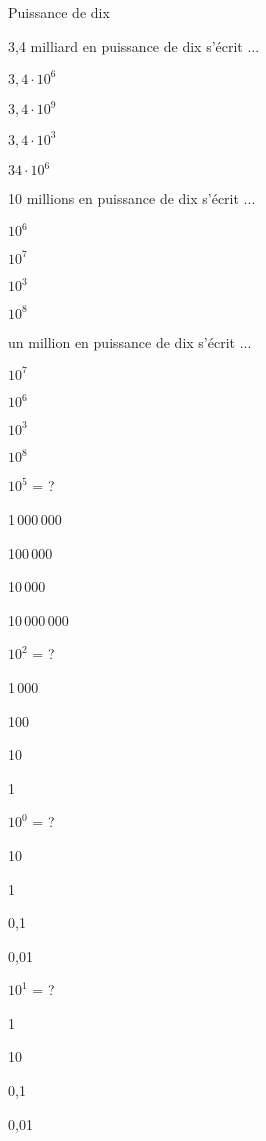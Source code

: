 \documentclass[12pt]{article}
\begin{document}
\begin{quiz}{Puissance de dix}

\begin{multi}[points=1]{}
3,4 milliard en puissance de dix s'écrit ...
\item $3,4\cdot 10^{6}$ 
\item   * $3,4\cdot 10^{9}$ 
\item $3,4\cdot 10^{3}$ 
\item  $34\cdot 10^{6}$ 
\end{multi}

\begin{multi}[points=1]{}
10 millions en puissance de dix s'écrit ...
\item $10^{6}$ 
\item   * $10^{7}$ 
\item $10^{3}$ 
\item  $10^{8}$ 
\end{multi}

\begin{multi}[points=1]{}
un million en puissance de dix s'écrit ...
\item $10^{7}$ 
\item   * $10^{6}$ 
\item $10^{3}$ 
\item  $10^{8}$ 
\end{multi}

\begin{multi}[points=1]{}
$10^5$ = ?
\item 1\,000\,000 
\item   * 100\,000
\item  10\,000
\item  10\,000\,000
\end{multi}

\begin{multi}[points=1]{}
$10^2$ = ?
\item 1\,000
\item   * 100
\item  10
\item  1
\end{multi}

\begin{multi}[points=1]{}
$10^0$ = ?
\item 10
\item   * 1
\item  0,1
\item  0,01
\end{multi}

\begin{multi}[points=1]{}
$10^1$ = ?
\item 1
\item   * 10
\item  0,1
\item  0,01
\end{multi}


\end{quiz}
\end{document}
